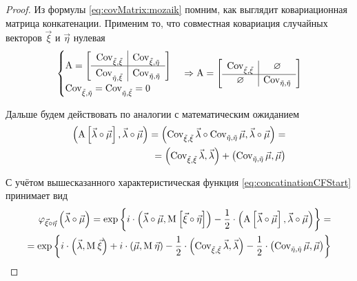 \begin{proof}
    Из формулы \eqref{eq:covMatrix:mozaik} помним, как выглядит ковариационная
    матрица конкатенации. Применим то, что совместная
    ковариация случайных векторов $\vec{\xi}$ и $\vec{\eta}$ нулевая
    $$\begin{cases}
        \operatorname{A}
            = \left[ \begin{array}{r|l}
                \operatorname{Cov^{}_{\vec{\xi}, \vec{\xi}}} & \operatorname{Cov^{}_{\vec{\xi}, \vec{\eta}}} \\
                \hline
                \operatorname{Cov^{}_{\vec{\eta}, \vec{\xi}}} & \operatorname{Cov^{}_{\vec{\eta}, \vec{\eta}}} \\
            \end{array} \right] \\
        \operatorname{Cov^{}_{\vec{\xi}, \vec{\eta}}} = \operatorname{Cov^{}_{\vec{\eta}, \vec{\xi}}} = 0
        \end{cases}
        \Rightarrow
        \operatorname{A}
            = \left[ \begin{array}{c|c}
                \operatorname{Cov^{}_{\vec{\xi}, \vec{\xi}}} & \varnothing \\
                \hline
                \varnothing & \operatorname{Cov^{}_{\vec{\eta}, \vec{\eta}}} \\
            \end{array} \right]$$

    Дальше будем действовать по аналогии с математическим ожиданием
    \begin{align*}
        \left( \operatorname{A} \left[ \vec{\lambda} \circ \vec{\mu} \right],
            \vec{\lambda} \circ \vec{\mu} \right)
        = \left( \operatorname{Cov^{}_{\vec{\xi}, \vec{\xi}}} \vec{\lambda}
                \circ \operatorname{Cov^{}_{\vec{\eta}, \vec{\eta}}} \vec{\mu},
            \vec{\lambda} \circ \vec{\mu} \right) = \\
        = \left( \operatorname{Cov^{}_{\vec{\xi}, \vec{\xi}}} \vec{\lambda}, \vec{\lambda} \right)
            + \left( \operatorname{Cov^{}_{\vec{\eta}, \vec{\eta}}} \vec{\mu}, \vec{\mu} \right)
    \end{align*}

    С учётом вышесказанного характеристическая функция
    \eqref{eq:concatinationCFStart} принимает вид
    \begin{align*}
        \varphi_{\vec{\xi} \circ \vec{\eta}}\left(
            \vec{\lambda} \circ \vec{\mu} \right)
        = \exp{\left\{
                i \cdot \left( \vec{\lambda} \circ \vec{\mu},
                    \operatorname{M}_{} \left[ \vec{\xi} \circ \vec{\eta} \right] \right)
                - \frac{1}{2} \cdot \left( \operatorname{A}
                    \left[ \vec{\lambda} \circ \vec{\mu} \right],
                    \vec{\lambda} \circ \vec{\mu} \right)
            \right\}} = \\
        = \exp{\left\{ 
            i \cdot \left( \vec{\lambda}, \operatorname{M}_{} \vec{\xi} \right)
                + i \cdot \left( \vec{\mu}, \operatorname{M}_{} \vec{\eta} \right)
                - \frac{1}{2} \cdot
                    \left( \operatorname{Cov^{}_{\vec{\xi}, \vec{\xi}}} \vec{\lambda}, \vec{\lambda} \right)
                - \frac{1}{2} \cdot
                    \left( \operatorname{Cov^{}_{\vec{\eta}, \vec{\eta}}} \vec{\mu}, \vec{\mu} \right)
                \right\}}
    \end{align*}


\end{proof}
